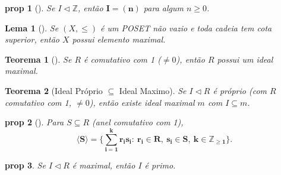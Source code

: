 \documentclass[11pt]{article}
\newcommand{\defname}[1]{\colorbox{yellow!30}{\strut \textbf{#1}}}
\newtheorem*{theorem}{Teorema}
\newtheorem*{proposition}{prop}
\newtheorem*{lemma}{Lema}
\theoremstyle{definition}
\begin{document}
\begin{multicols}{3}
\begin{proposition}[\defname{Ideais de \(\mathbb{Z}\)}]
Se \(I\triangleleft \mathbb{Z}\), então \(\mathbf{I=(n)}\) para algum \(n\ge 0\).
\end{proposition}

\begin{lemma}[\defname{Lema de Zorn}]
Se \((X,\le)\) é um POSET não vazio e toda cadeia tem cota superior, então \(X\) possui elemento maximal.
\end{lemma}

\begin{theorem}[\defname{Existência de Ideal Maximal}]
Se \(R\) é comutativo com 1 (\(\neq 0\)), então \(R\) possui um ideal maximal.
\end{theorem}

\begin{theorem}[Ideal Próprio $\subseteq$ Ideal Maximo]
Se \(I\triangleleft R\) é próprio (com $R$ comutativo com 1, \(\neq 0\)), então existe ideal maximal \(m\) com \(I\subseteq m\).
\end{theorem}

\begin{proposition}[\defname{Forma Explícita do Ideal Gerado}]
Para \(S\subseteq R\) (anel comutativo com 1),
\[
\mathbf{\langle S\rangle=\bigl\{\sum_{i=1}^k r_i s_i:\ r_i\in R,\ s_i\in S,\ k\in\mathbb{Z}_{\ge 1}\bigr\}}.
\]
\end{proposition}
\begin{proposition}
Se  \(I\triangleleft R\) é maximal, então $I$ é primo.   
\end{proposition}


\end{multicols}
\newpage
\end{document}
